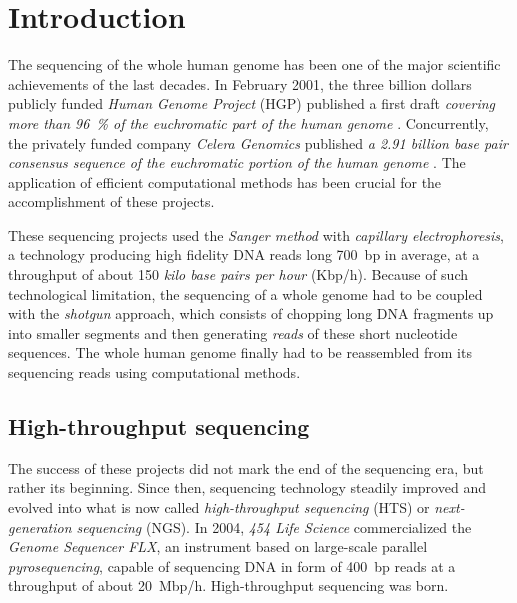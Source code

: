 \chapter{Introduction}

The sequencing of the whole human genome has been one of the major scientific achievements of the last decades.
In February 2001, the three billion dollars publicly funded \emph{Human Genome Project} (HGP) published a first draft \emph{covering more than 96~\% of the euchromatic part of the human genome} \citep{Consortium2001}.
Concurrently, the privately funded company \emph{Celera Genomics} published \emph{a 2.91 billion base pair consensus sequence of the euchromatic portion of the human genome} \citep{Venter2001}.
The application of efficient computational methods has been crucial for the accomplishment of these projects.


These sequencing projects used the \emph{Sanger method} \citep{Sanger1977} with \emph{capillary electrophoresis}, a technology producing high fidelity DNA reads long 700~bp in average, at a throughput of about 150 \emph{kilo base pairs per hour} (Kbp/h).
Because of such technological limitation, the sequencing of a whole genome had to be coupled with the \emph{shotgun} approach, 
which consists of chopping long DNA fragments up into smaller segments and then generating \emph{reads} of these short nucleotide sequences.
The whole human genome finally had to be reassembled from its sequencing reads using computational methods.



\section{High-throughput sequencing}
\label{sec:intro:hts}

The success of these projects did not mark the end of the sequencing era, but rather its beginning.
Since then, sequencing technology steadily improved and evolved into what is now called \emph{high-throughput sequencing} (HTS) or \emph{next-generation sequencing} (NGS).
In 2004, \emph{454 Life Science} commercialized the \emph{Genome Sequencer FLX}, an instrument based on large-scale parallel \emph{pyrosequencing}, capable of sequencing DNA in form of 400~bp reads at a throughput of about 20~Mbp/h.
High-throughput sequencing was born.

